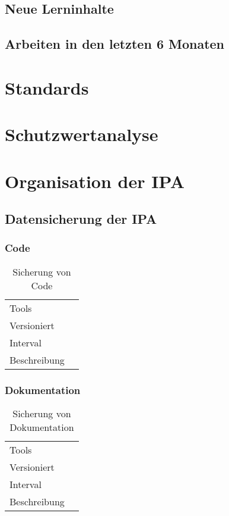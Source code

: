 \section{Neue Lerninhalte}
\section{Arbeiten in den letzten 6 Monaten}


\chapter{Standards}

\chapter{Schutzwertanalyse}

\chapter{Organisation der IPA}
\section{Datensicherung der IPA}

\subsection{Code}

\begin{table}[H]
    \begin{tabular}{|L{0.3\textwidth}|L{0.7\textwidth}|}
        \hline
         \\[10pt]
        \hline
        Tools & \\
        \hline
        Versioniert & \\
        \hline
        Interval & \\
        \hline
        Beschreibung & \\
        \hline
    \end{tabular}
    \caption{Sicherung von Code}
\end{table}

\subsection{Dokumentation}

\begin{table}[H]
    \begin{tabular}{|L{0.3\textwidth}|L{0.7\textwidth}|}
        \hline
         \\[10pt]
        \hline
        Tools & \\
        \hline
        Versioniert & \\
        \hline
        Interval & \\
        \hline
        Beschreibung & \\
        \hline
    \end{tabular}
    \caption{Sicherung von Dokumentation}
\end{table}


